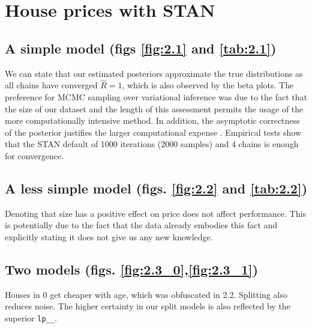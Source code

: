 \documentclass[11pt,a4paper,titlepage]{article}
\begin{document}
\section{House prices with STAN}
  \subsection{A simple model (figs \ref{fig:2.1} and \ref{tab:2.1})}
  We can state that our estimated posteriors approximate the true distributions as all chains have converged \(\hat{R} = 1\), which is also observed by the beta plots. The preference for MCMC sampling over variational inference was due to the fact that the size of our dataset and the length of this assessment permits the usage of the more computationally intensive method. In addition, the asymptotic correctness of the posterior justifies the larger computational expense \parencite{BleiVI}. Empirical tests show that the STAN default of 1000 iterations (2000 samples) and 4 chains is enough for convergence.

  \subsection{A less simple model (figs. \ref{fig:2.2} and \ref{tab:2.2})}
  Denoting that size has a positive effect on price does not affect performance. This is potentially due to the fact that the data already embodies this fact and explicitly stating it does not give us any new knowledge.

  \subsection{Two models (figs. \ref{fig:2.3_0},\ref{fig:2.3_1})}
  Houses in 0 get cheaper with age, which was obfuscated in 2.2. Splitting also reduces noise. The higher certainty in our split models is also reflected by the superior \texttt{lp\_\_}.
\end{document}
